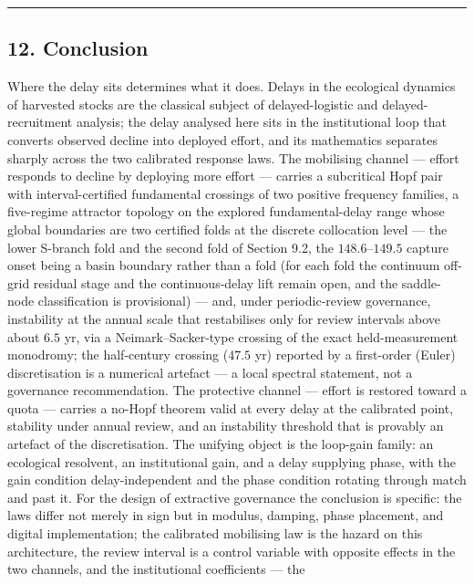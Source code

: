 \documentclass[11pt]{article}
\begin{document}
\begin{center}\rule{0.5\linewidth}{0.5pt}\end{center}

\subsection{12. Conclusion}\label{conclusion}

Where the delay sits determines what it does. Delays in the ecological
dynamics of harvested stocks are the classical subject of
delayed-logistic and delayed-recruitment analysis; the delay analysed
here sits in the institutional loop that converts observed decline into
deployed effort, and its mathematics separates sharply across the two
calibrated response laws. The mobilising channel --- effort responds to
decline by deploying more effort --- carries a subcritical Hopf pair
with interval-certified fundamental crossings of two positive frequency
families, a five-regime attractor topology on the explored
fundamental-delay range whose global boundaries are two certified folds
at the discrete collocation level --- the lower S-branch fold and the
second fold of Section 9.2, the \(148.6\)--\(149.5\) capture onset being
a basin boundary rather than a fold (for each fold the continuum
off-grid residual stage and the continuous-delay lift remain open, and
the saddle-node classification is provisional) --- and, under
periodic-review governance, instability at the annual scale that
restabilises only for review intervals above about \(6.5\) yr, via a
Neimark--Sacker-type crossing of the exact held-measurement monodromy;
the half-century crossing (\(47.5\) yr) reported by a first-order
(Euler) discretisation is a numerical artefact --- a local spectral
statement, not a governance recommendation. The protective channel ---
effort is restored toward a quota --- carries a no-Hopf theorem valid at
every delay at the calibrated point, stability under annual review, and
an instability threshold that is provably an artefact of the
discretisation. The unifying object is the loop-gain family: an
ecological resolvent, an institutional gain, and a delay supplying
phase, with the gain condition delay-independent and the phase condition
rotating through match and past it. For the design of extractive
governance the conclusion is specific: the laws differ not merely in
sign but in modulus, damping, phase placement, and digital
implementation; the calibrated mobilising law is the hazard on this
architecture, the review interval is a control variable with opposite
effects in the two channels, and the institutional coefficients --- the
\end{document}

